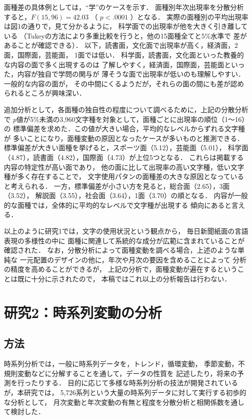   面種差の具体例としては，“学”のケースを示す．
面種別年次出現率を分散分析すると，$F(15,96) = 42.03$ （ $p<.0001$ ）となる．
実際の面種別の平均出現率は図1の通りで，見て分かるように，
科学面での出現率が他を大きく引き離している
（Tukeyの方法により多重比較を行うと，他の15面種全てと5\%水準で
差があることが確認できる）．
以下，読書面，文化面で出現率が高く，経済面，2面，国際面，芸能面，
1面では低い．
科学面，読書面，文化面といった教養的な内容の面で多く出現するのは
了解しやすく，経済面，国際面，芸能面といった，内容が独自で学問の関与が
薄そうな面で出現率が低いのも理解しやすい．一般的な内容の面が，
その中間にくるようだが，それらの面の間にも差が認められるところが興味深い．

  追加分析として，各面種の独自性の程度について調べるために，上記の分散分析で
$p$値が5\%未満の3,960文字種を対象として，面種ごとに出現率の順位（1〜16）の
標準偏差を求めた．この値が大きい場合，平均的なレベルからずれる文字種が
多いことになり，面種変動の原因となったケースが多いものと推測できる．
標準偏差が大きい面種を挙げると，スポーツ面（5.12），芸能面（5.01），
科学面（4.87），読書面（4.82），国際面（4.73）が上位5つとなる．
これらは掲載する内容の特定性が高い面であり，
他の面に比して出現率の高い文字種，低い文字種が多く存在することで，
文字使用パタンの面種差の大きな原因となっていると考えられる．
一方，標準偏差が小さい方を見ると，総合面（2.65），3面（3.52），
解説面（3.55），社会面（3.64），1面（3.70）の順となる．
内容が一般的な面種では，全体的に平均的なレベルで文字種が出現する
傾向にあると言える．

  以上のように研究1では，文字の使用状況という観点から，
毎日新聞紙面の言語表現の多様性の中に
面種に関連して系統的な成分が広範に含まれていることが確認された．
なお，分散分析によって面種変動を調べる場合，上述のような単純な
一元配置のデザインの他に，年次や月次の要因を含めることによって
分析の精度を高めることができるが，
上記の分析で，面種変動が遍在するということは既に十分に示されたので，
本稿ではこれ以上の分析報告は行わない．


\section{研究2：時系列変動の分析}

\subsection{方法}

  時系列分析では，一般に時系列データを，トレンド，循環変動，
季節変動，不規則変動などに分解することを通して，データの性質を
記述したり，将来の予測を行ったりする．
目的に応じて多様な時系列分析の技法が開発されているが，本研究では，
5,726系列という大量の時系列データに対して実行する初歩的な分析として，
月次変動と年次変動の有無と程度を分散分析と相関係数を通して検討した．

